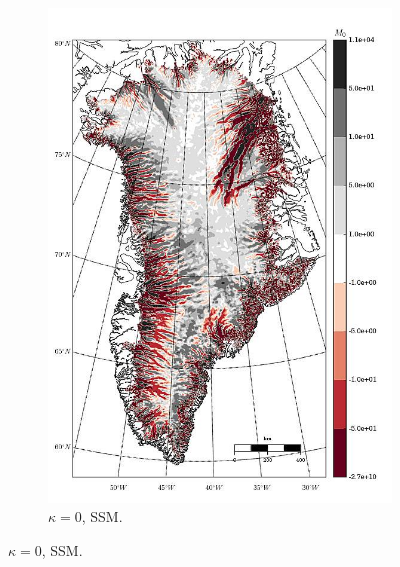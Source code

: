 \begin{figure}
\begin{subfigure}[b]{0.25\linewidth}
    \includegraphics[width=\linewidth]{images/balance_velocity/greenland/misfit_5H_kappa_0_SSM.jpg}
  \caption{$\kappa = 0$, SSM.}
  \label{greenland_bv_image_kappa_5_SSM_misfit}
  \end{subfigure}


\end{figure}
